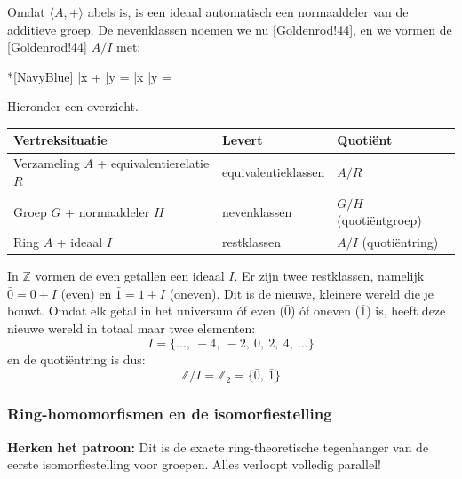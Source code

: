 Omdat $\langle A, + \rangle$ abels is, is een ideaal automatisch een normaaldeler van de additieve groep. De nevenklassen noemen we nu [Goldenrod!44], en we vormen de [Goldenrod!44] $A/I$ met:
\begin{equationbox}*[NavyBlue]
    \bar{x} + \bar{y} =  \qquad {} \qquad \bar{x} \cdot \bar{y} = 
\end{equationbox}
Hieronder een overzicht.
\begin{center}
    \renewcommand{\arraystretch}{1.5}
    \begin{tabularx}{\linewidth}{@{} >{\hsize}L >{\hsize}L >{\hsize}L @{}}
        \textbf{Vertreksituatie} & \textbf{Levert} & \textbf{Quotiënt} \\
        \hline
        Verzameling $A$ + equivalentierelatie $R$ & equivalentieklassen & $A/R$ \\
        \thinrule
        Groep $G$ + normaaldeler $H$ & nevenklassen & $G/H$ (quotiëntgroep) \\
        \thinrule
        Ring $A$ + ideaal $I$ & restklassen & $A/I$ (quotiëntring) \\
        \hline
    \end{tabularx}
\end{center}

\textbf{} In $\mathbb{Z}$ vormen de even getallen een ideaal $I$. Er zijn twee restklassen, namelijk $\bar{0} = 0 + I$ (even) en $\bar{1} = 1 + I$ (oneven). Dit is de nieuwe, kleinere wereld die je bouwt. Omdat elk getal in het universum óf even ($\bar{0}$) óf oneven ($\bar{1}$) is, heeft deze nieuwe wereld in totaal maar twee elementen:
\begin{equation*}
    I = \{\dots,\ -4,\ -2,\ 0,\ 2,\ 4,\ \dots\}
\end{equation*}
en de quotiëntring is dus:
\begin{equation*}
    \mathbb{Z}/I = \mathbb{Z}_2 = \{\bar{0},\ \bar{1} \}
\end{equation*}

\subsubsection{Ring-homomorfismen en de isomorfiestelling}

\begin{barbox}[PineGreen][gray!3]
    \textcolor{PineGreen}{\textbf{Herken het patroon:}} Dit is de exacte ring-theoretische tegenhanger van de eerste isomorfiestelling voor groepen. Alles verloopt volledig parallel!
\end{barbox}

